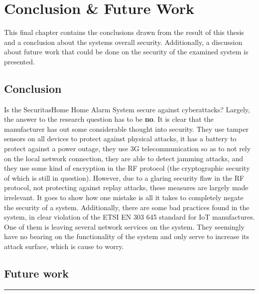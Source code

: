\chapter{Conclusion \& Future Work} \label{ch:conclusion}
This final chapter contains the conclusions drawn from the result of this thesis and a conclusion about the systems overall security. Additionally, a discussion about future work that could be done on the security of the examined system is presented.

\section{Conclusion}
Is the SecuritasHome Home Alarm System secure against cyberattacks? Largely, the answer to the research question has to be \textbf{no}. It is clear that the manufacturer has out some considerable thought into security. They use tamper sensors on all devices to protect against physical attacks, it has a battery to protect against a power outage, they use 3G telecommunication so as to not rely on the local network connection, they are able to detect jamming attacks, and they use some kind of encryption in the RF protocol (the cryptographic security of which is still in question). However, due to a glaring security flaw in the RF protocol, not protecting against replay attacks, these measures are largely made irrelevant. It goes to show how one mistake is all it takes to completely negate the security of a system. Additionally, there are some bad practices found in the system, in clear violation of the ETSI EN 303 645 standard for IoT manufactures. One of them is leaving several network services on the system. They seemingly have no bearing on the functionality of the system and only serve to increase its attack surface, which is cause to worry.

\section{Future work} \label{ch:conclusion:related-work}
\todo

\noindent\rule{\textwidth}{0.4mm}
